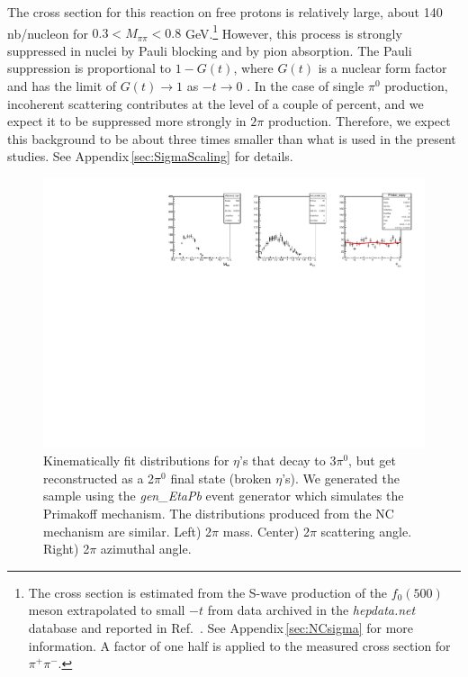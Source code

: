 The cross section for this reaction on free protons is relatively
large, about 140 nb/nucleon for $0.3 < M_{\pi\pi} < 0.8$
GeV.\footnote{The cross section is estimated from the S-wave
  production of the $f_0(500)$ meson extrapolated to small $-t$ from
  data archived in the {\em hepdata.net} database and reported in
  Ref.~\cite{Battaglieri:2009aa}. See Appendix\,\ref{sec:NCsigma} for
  more information. A factor of one half is applied to the measured
  cross section for $\pi^+\pi^-$.} However, this process is strongly
suppressed in nuclei by Pauli blocking and by pion absorption. The
Pauli suppression is proportional to $1-G(t)$, where $G(t)$ is a
nuclear form factor and has the limit of $G(t)\to1$ as $-t\to0$
\cite{Gevorkyan:2009ge,primex_inc}. In the case of single $\pi^0$
production, incoherent scattering contributes at the level of a couple
of percent, and we expect it to be suppressed more strongly in $2\pi$
production.  Therefore, we expect this background to be about three times
smaller than what is used in the present studies. See Appendix\,\ref{sec:SigmaScaling} for details.

\begin{figure}[tbp]
\begin{center}
\includegraphics[width=16cm,clip=true]{figures/BrokenEtasPrim.pdf}
\caption{Kinematically fit distributions for $\eta$'s that decay to 3$\pi^0$, but get reconstructed as a 2$\pi^0$ final state (broken $\eta$'s).
We generated the sample using the {\em gen\_EtaPb} event generator which simulates the Primakoff mechanism. The distributions produced from the NC mechanism are similar. 
Left) 2$\pi$ mass. Center) 2$\pi$ scattering angle. Right) 2$\pi$ azimuthal angle.
\label{fig:eta}}
\end{center} 
\end{figure}



